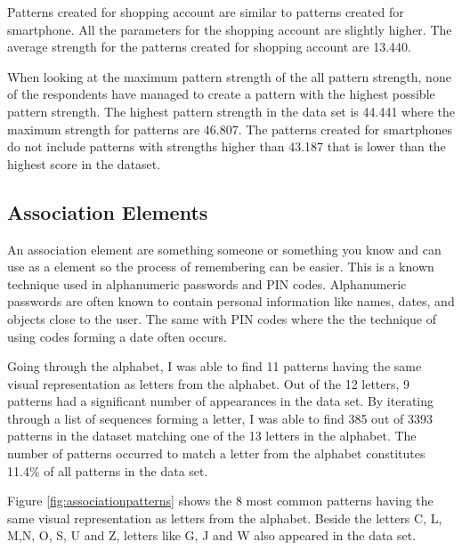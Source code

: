     Patterns created for shopping account are similar to patterns created for smartphone. All the parameters for the shopping account are slightly higher. The average strength for the patterns created for shopping account are 13.440.

    When looking at the maximum pattern strength of the all pattern strength, none of the respondents have managed to create a pattern with the highest possible pattern strength. The highest pattern strength in the data set is 44.441 where the maximum strength for patterns are 46.807. The patterns created for smartphones do not include patterns with strengths higher than 43.187 that is lower than the highest score in the dataset. 

  \subsection{Association Elements} \label{sec:associationelements}
    An association element are something someone or something you know and can use as a element so the process of remembering can be easier. This is a known technique used in alphanumeric passwords and PIN codes. Alphanumeric passwords are often known to contain personal information like names, dates, and objects close to the user. The same with PIN codes where the the technique of using codes forming a date often occurs. 

    Going through the alphabet, I was able to find 11 patterns having the same visual representation as letters from the alphabet. Out of the 12 letters, 9 patterns had a significant number of appearances in the data set. By iterating through a list of sequences forming a letter, I was able to find 385 out of 3393 patterns in the dataset matching one of the 13 letters in the alphabet. The number of patterns occurred to match a letter from the alphabet constitutes 11.4\% of all patterns in the data set. 

    Figure \ref{fig:associationpatterns} shows the 8 most common patterns having the same visual representation as letters from the alphabet. Beside the letters C, L, M,N, O, S, U and Z, letters like G, J and W also appeared in the data set.

    \clearpage

